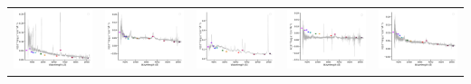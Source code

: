 \begin{center}
\begin{longtable}{l l l l l }
    \includegraphics[width=0.2\linewidth, clip]{Figs/Figs-sdss/spec-6781-56599-0575-STRIPE82-0056-038512.pdf} & \includegraphics[width=0.2\linewidth, clip]{Figs/Figs-sdss/spec-6782-56572-0334-STRIPE82-0059-014841.pdf} & \includegraphics[width=0.2\linewidth, clip]{Figs/Figs-sdss/spec-7820-56984-0072-STRIPE82-0065-043212.pdf} & \includegraphics[width=0.2\linewidth, clip]{Figs/Figs-sdss/spec-7822-57041-0034-STRIPE82-0061-046539.pdf} & \includegraphics[width=0.2\linewidth, clip]{Figs/Figs-sdss/spec-7856-57260-0204-STRIPE82-0018-064634.pdf} \\

\end{longtable}
\end{center}
